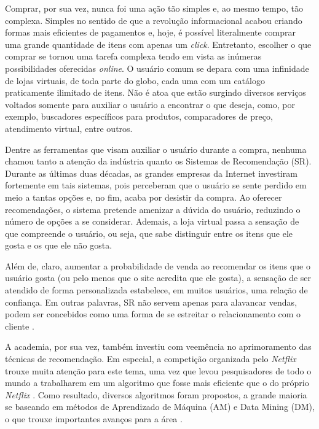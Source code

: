 Comprar, por sua vez, nunca foi uma ação tão simples e, ao mesmo tempo, tão complexa. Simples no sentido de que a revolução informacional acabou criando formas mais eficientes de pagamentos e, hoje, é possível literalmente comprar uma grande quantidade de itens com apenas um \textit{click}. Entretanto, escolher o que comprar se tornou uma tarefa complexa tendo em vista as inúmeras possibilidades oferecidas \textit{online}. O usuário comum se depara com uma infinidade de lojas virtuais, de toda parte do globo, cada uma com um catálogo praticamente ilimitado de itens. Não é atoa que estão surgindo diversos serviços voltados somente para auxiliar o usuário a encontrar o que deseja, como, por exemplo, buscadores específicos para produtos, comparadores de preço, atendimento virtual, entre outros.

Dentre as ferramentas que visam auxiliar o usuário durante a compra, nenhuma chamou tanto a atenção da indústria quanto os Sistemas de Recomendação (SR). Durante as últimas duas décadas, as grandes empresas da Internet investiram fortemente em tais sistemas, pois perceberam que o usuário se sente perdido em meio a tantas opções e, no fim, acaba por desistir da compra. Ao oferecer recomendações, o sistema pretende amenizar a dúvida do usuário, reduzindo o número de opções a se considerar. Ademais, a loja virtual passa a sensação de que compreende o usuário, ou seja, que sabe distinguir entre os itens que ele gosta e os que ele não gosta. 


Além de, claro, aumentar a probabilidade de venda ao recomendar os itens que o usuário gosta (ou pelo menos que o site acredita que ele gosta), a sensação de ser atendido de forma personalizada estabelece, em muitos usuários, uma relação de confiança. Em outras palavras, SR não servem apenas para alavancar vendas, podem ser concebidos como uma forma de se estreitar o relacionamento com o cliente \citep{Schafer:1999:RSE:336992.337035}.

A academia, por sua vez, também investiu com veemência no aprimoramento das técnicas de recomendação. Em especial, a competição organizada pelo \textit{Netflix} trouxe muita atenção para este tema, uma vez que levou pesquisadores de todo o mundo a trabalharem em um algoritmo que fosse mais eficiente que o do próprio \textit{Netflix} \citep{Bennett07thenetflix}. Como resultado, diversos algoritmos foram propostos, a grande maioria se baseando em métodos de Aprendizado de Máquina (AM) e Data Mining (DM), o que trouxe importantes avanços para a área \citep{Bell:2007:LNP:1345448.1345465, ricci_recommender_2011}.

